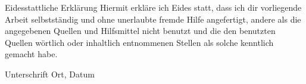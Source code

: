 Eidesstattliche Erklärung
Hiermit erkläre ich Eides statt, dass ich dir vorliegende Arbeit selbstständig und ohne unerlaubte fremde Hilfe angefertigt, andere als die angegebenen Quellen und Hilfsmittel nicht benutzt und die den benutzten Quellen wörtlich oder inhaltlich entnommenen Stellen als solche kenntlich gemacht habe.


Unterschrift Ort, Datum

